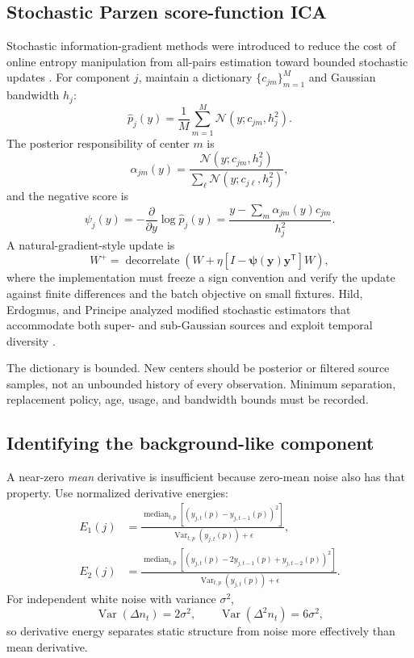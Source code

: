 \documentclass[11pt]{article}
\newcommand{\Var}{\operatorname{Var}}
\newcommand{\trans}{\mathsf T}
\begin{document}
\subsection{Stochastic Parzen score-function ICA}

Stochastic information-gradient methods were introduced to reduce the cost of
online entropy manipulation from all-pairs estimation toward bounded stochastic
updates \cite{erdogmus2003sig}. For component $j$, maintain a dictionary
$\{c_{jm}\}_{m=1}^{M}$ and Gaussian bandwidth $h_j$:
\begin{equation}
\widehat p_j(y)
=
\frac1M\sum_{m=1}^{M}
\mathcal N(y;c_{jm},h_j^2).
\end{equation}
The posterior responsibility of center $m$ is
\begin{equation}
\alpha_{jm}(y)
=
\frac{\mathcal N(y;c_{jm},h_j^2)}
{\sum_{\ell}\mathcal N(y;c_{j\ell},h_j^2)},
\end{equation}
and the negative score is
\begin{equation}
\psi_j(y)
=
-\frac{\partial}{\partial y}\log\widehat p_j(y)
=
\frac{y-\sum_m\alpha_{jm}(y)c_{jm}}{h_j^2}.
\label{eq:clean-score}
\end{equation}
A natural-gradient-style update is
\begin{equation}
W^{+}
=
\operatorname{decorrelate}
\left(
W+\eta
[I-\bm\psi(\bm y)\bm y^{\trans}]W
\right),
\label{eq:natural-update}
\end{equation}
where the implementation must freeze a sign convention and verify the update
against finite differences and the batch objective on small fixtures. Hild,
Erdogmus, and Principe analyzed modified stochastic estimators that accommodate
both super- and sub-Gaussian sources and exploit temporal diversity
\cite{hild2006entropy}.

The dictionary is bounded. New centers should be posterior or filtered source
samples, not an unbounded history of every observation. Minimum separation,
replacement policy, age, usage, and bandwidth bounds must be recorded.

\subsection{Identifying the background-like component}

A near-zero \emph{mean} derivative is insufficient because zero-mean noise also
has that property. Use normalized derivative energies:
\begin{align}
E_1(j)
&=
\frac{\operatorname{median}_{t,p}
[(y_{j,t}(p)-y_{j,t-1}(p))^2]}
{\Var_{t,p}(y_{j,t}(p))+\epsilon},\\
E_2(j)
&=
\frac{\operatorname{median}_{t,p}
[(y_{j,t}(p)-2y_{j,t-1}(p)+y_{j,t-2}(p))^2]}
{\Var_{t,p}(y_{j,t}(p))+\epsilon}.
\end{align}
For independent white noise with variance $\sigma^2$,
\begin{equation}
\Var(\Delta n_t)=2\sigma^2,
\qquad
\Var(\Delta^2n_t)=6\sigma^2,
\end{equation}
so derivative energy separates static structure from noise more effectively than
mean derivative.
\end{document}
